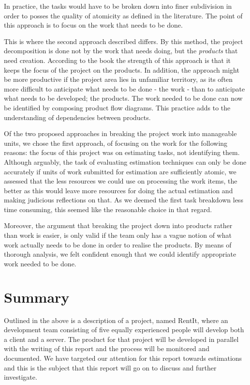In practice, the tasks would have to be broken down into finer subdivision in order to posses the quality of atomicity as defined in the literature. The point of this approach is to focus on the work that needs to be done.

This is where the second approach described differs. By this method, the project decomposition is done not by the work that needs doing, but the \textit{products}  that need creation. According to the book the strength of this approach is that it keeps the focus of the project on the products. In addition, the approach might be more productive if the project area lies in unfamiliar territory, as its often more difficult to anticipate what needs to be done - the work - than to anticipate what needs to be developed; the products. The work needed to be done can now be identified by composing product flow diagrams. This practice adds to the understanding of dependencies between products.

Of the two proposed approaches in breaking the project work into manageable units, we chose the first approach, of focusing on the work for the following reasons: the focus of this project was on estimating tasks, not identifying them. Although arguably, the task of evaluating estimation techniques can only be done accurately if units of work submitted for estimation are sufficiently atomic, we assessed that the less resources we could use on processing the work items, the better as this would leave more resources for doing the actual estimation and making judicious reflections on that. As we deemed the first task breakdown less time consuming, this seemed like the reasonable choice in that regard.

Moreover, the argument that breaking the project down into products rather than work is easier, is only valid if the team only has a vague notion of what work actually needs to be done in order to realise the products. By means of thorough analysis, we felt confident enough that we could identify appropriate work needed to be done.


\section{Summary}
Outlined in the above is a description of a project, named RentIt, where an development team consisting of five equally experienced people will develop both a client and a server. The product for that project will be developed in parallel with the writing of this report and the process will be monitored and documented. We have targeted our attention for this report towards estimations and this is the subject that this report will go on to discuss and further investigate.

